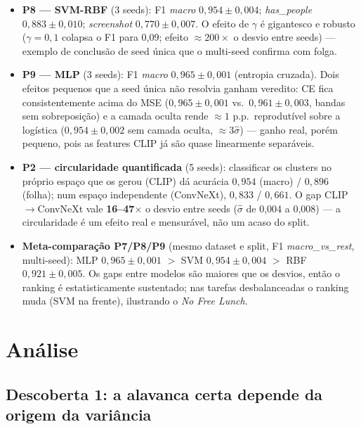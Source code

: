 \documentclass[12pt]{article}
\begin{document}
\begin{itemize}
  \item \textbf{P8 --- SVM-RBF} (3 seeds): F1 \emph{macro} $0{,}954 \pm
        0{,}004$; \emph{has\_people} $0{,}883 \pm 0{,}010$;
        \emph{screenshot} $0{,}770 \pm 0{,}007$. O efeito de $\gamma$ é
        gigantesco e robusto ($\gamma = 0{,}1$ colapsa o F1 para 0{,}09;
        efeito $\approx 200\times$ o desvio entre seeds) --- exemplo de
        conclusão de seed única que o multi-seed confirma com folga.
  \item \textbf{P9 --- MLP} (3 seeds): F1 \emph{macro} $0{,}965 \pm 0{,}001$
        (entropia cruzada). Dois efeitos pequenos que a seed única não
        resolvia ganham veredito: CE fica consistentemente acima do MSE
        ($0{,}965 \pm 0{,}001$ vs.\ $0{,}961 \pm 0{,}003$, bandas sem
        sobreposição) e a camada oculta rende $\approx 1$ p.p.\ reprodutível
        sobre a logística ($0{,}954 \pm 0{,}002$ sem camada oculta,
        $\approx 3\hat{\sigma}$) --- ganho real, porém pequeno, pois as
        features CLIP já são quase linearmente separáveis.
  \item \textbf{P2 --- circularidade quantificada} (5 seeds): classificar os
        clusters no próprio espaço que os gerou (CLIP) dá acurácia
        $0{,}954$ (macro) / $0{,}896$ (folha); num espaço independente
        (ConvNeXt), $0{,}833$ / $0{,}661$. O gap CLIP$\to$ConvNeXt vale
        \textbf{16--47$\times$} o desvio entre seeds ($\hat{\sigma}$ de
        0{,}004 a 0{,}008) --- a circularidade é um efeito real e mensurável,
        não um acaso do split.
  \item \textbf{Meta-comparação P7/P8/P9} (mesmo dataset e split, F1
        \emph{macro\_vs\_rest}, multi-seed): MLP $0{,}965 \pm 0{,}001$ $>$
        SVM $0{,}954 \pm 0{,}004$ $>$ RBF $0{,}921 \pm 0{,}005$. Os gaps entre
        modelos são maiores que os desvios, então o ranking é estatisticamente
        sustentado; nas tarefas desbalanceadas o ranking muda (SVM na frente),
        ilustrando o \emph{No Free Lunch}.
\end{itemize}

\section{Análise}\label{sec:ana}

\subsection{Descoberta 1: a alavanca certa depende da origem da variância}
\label{sec:ana-var}
\end{document}
